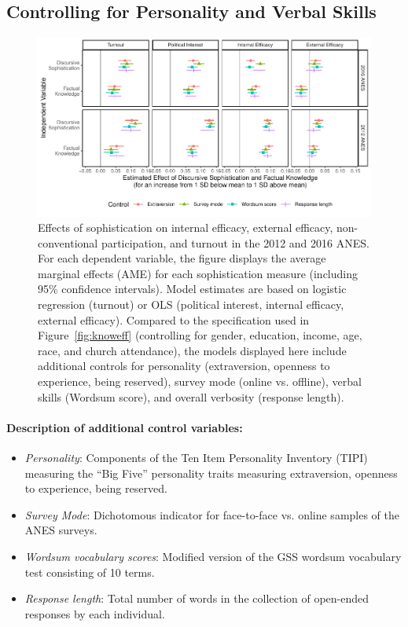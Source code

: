 \clearpage
\subsection{Controlling for Personality and Verbal Skills}\label{app:personality}

\begin{figure}[h]\centering
	\includegraphics{../fig/knoweff_robust.pdf}
	\caption{Effects of sophistication on internal efficacy, external efficacy, non-conventional participation, and turnout in the 2012 and 2016 ANES. For each dependent variable, the figure displays the average marginal effects (AME) for each sophistication measure (including 95\% confidence intervals). Model estimates are based on logistic regression (turnout) or OLS (political interest, internal efficacy, external efficacy). Compared to the specification used in Figure~\ref{fig:knoweff} (controlling for gender, education, income, age, race, and church attendance), the models displayed here include additional controls for personality (extraversion, openness to experience, being reserved), survey mode (online vs. offline), verbal skills (Wordsum score), and overall verbosity (response length).%
	}\label{fig:knoweff_robust}
\end{figure}

\vspace{1em}

\paragraph{Description of additional control variables:}

\begin{itemize}
	\item \textit{Personality}: Components of the Ten Item Personality Inventory (TIPI) measuring the ``Big Five'' personality traits measuring extraversion, openness to experience, being reserved.
	\item \textit{Survey Mode}: Dichotomous indicator for face-to-face vs. online samples of the ANES surveys.
	\item \textit{Wordsum vocabulary scores}: Modified version of the GSS wordsum vocabulary test consisting of 10 terms.
	\item \textit{Response length}: Total number of words in the collection of open-ended responses by each individual.
\end{itemize}

